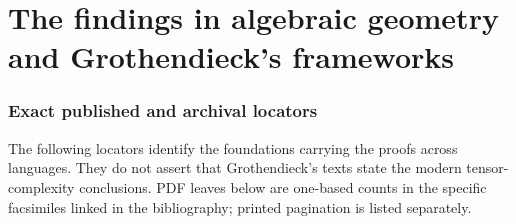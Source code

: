 \part{The findings in algebraic geometry and Grothendieck's frameworks}
\label{part:dictionary}

\section{Exact published and archival locators}
\label{sec:groth-locators}

The following locators identify the foundations carrying the
proofs across languages. They do not assert that Grothendieck's
texts state the modern tensor-complexity conclusions. PDF leaves
below are one-based counts in the specific facsimiles linked in
the bibliography; printed pagination is listed separately.

